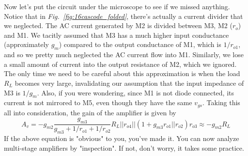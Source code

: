 Now let's put the circuit under the microscope to see if we missed anything.  Notice that in \emph{Fig.~\ref{fig:16cascode_folded}}, there's actually a current divider that we neglected.  The AC current generated by M2 is divided between M3, M2 ($r_o$) and M1.  We tacitly assumed that M3 has a much higher input conductance (approximately $g_m$) compared to the output conductance of M1, which is $1/r_{o1}$, and so we pretty much neglected the AC current flow into M1.  Similarly, we lose a small amount of current into the output resistance of M2, which we ignored.  The only time we need to be careful about this approximation is when the load $R_L$ becomes very large, invalidating our assumption that the input impedance of M3 is $1/g_m$.  Also, if you were wondering, since M1 is not diode connected, its current is not mirrored to M5, even though they have the same $v_{gs}$.  Taking this all into consideration, the gain of the amplifier is given by
    \begin{equation}
        A_v = - g_{m2} \frac{g_{m3}}{g_{m3} + 1/r_{o1} + 1/r_{o2}} R_L || r_{o4} || (1 + g_{m3} r_{o1}||r_{o2}) r_{o3} \approx -g_{m2} R_L
    \end{equation} 
If the above equation is "obvious" to you, you've made it.  You can now analyze multi-stage amplifiers by "inspection".  If not, don't worry, it takes some practice.
\newpage
